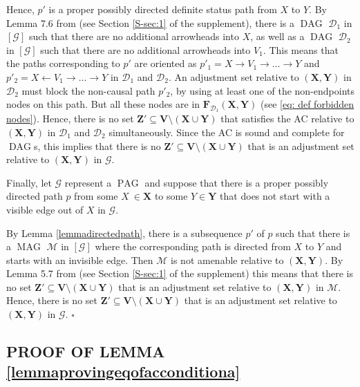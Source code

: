 \documentclass[]{article}
\DeclareMathOperator{\DAG}{DAG}
\DeclareMathOperator{\MAG}{MAG}
\DeclareMathOperator{\PAG}{PAG}
\newenvironment{proofsketchamenab}{\noindent{\bf Proof of Lemma \ref{lemmaadjamengen}:}}%
{\hfill $\square$}
\theoremstyle{definition}
\theoremstyle{remark}
\newcommand{\vars}[1][V]{\mathbf{#1}}
\newcommand{\g}[1][G]{\mathcal{#1}}
\newcommand{\fb}[2][X,Y]{\mathbf{F}_{#2}(\mathbf{#1})}%
\begin{document}
\begin{proofsketchamenab}
   Hence, $p'$ is a proper possibly directed definite status path from $X$ to $Y$. By Lemma 7.6 from \citet{maathuis2013generalized} (see Section \ref{S-sec:1} of the supplement), there is a $\DAG$ $\g[D]_1$ in $[\g]$ such that there are no additional arrowheads into $X$, as well as a $\DAG$ $\g[D]_2$ in $[\g]$ such that there are no additional arrowheads into $V_1$. This means that the paths corresponding to $p'$ are oriented as $p'_1 = X \to V_1 \to \dots \to Y$ and $p'_2 = X \leftarrow V_1 \to \dots \to Y$ in $\g[D]_1$ and $\g[D]_2$.
   An adjustment set relative to $(\mathbf{X},\mathbf{Y})$ in $\g[D]_2$ must block the non-causal path $p'_{2}$, by using at least one of the non-endpoints nodes on this path. But all these nodes are in $\fb{\g[D]_1}$ (see \eqref{eq: def forbidden nodes}). Hence, there is no set $\mathbf{Z}' \subseteq \vars \setminus (\mathbf{X} \cup \mathbf{Y})$ that satisfies the AC relative to $(\mathbf{X},\mathbf{Y})$ in $\g[D]_1$ and $\g[D]_2$ simultaneously. Since the AC is sound and complete for $\DAG$s, this implies that there is no $\mathbf{Z}' \subseteq \vars \setminus (\mathbf{X} \cup \mathbf{Y})$ that is an adjustment set relative to $(\mathbf{X},\mathbf{Y})$ in $\g$.

   Finally, let $\g$ represent a $\PAG$ and suppose that there is a proper possibly directed path $p$ from some $X\ \in \mathbf{X}$ to some $Y\in \mathbf{Y}$ that does not start with a visible edge out of $X$ in $\g$.

  By Lemma \ref{lemmadirectedpath}, there is a subsequence $p'$ of $p$ such that there is a $\MAG$ $\g[M]$ in $[\g]$ where the corresponding path is directed from $X$ to $Y$ and starts with an invisible edge.
   Then $\g[M]$ is not amenable relative to $(\mathbf{X},\mathbf{Y})$. By Lemma 5.7 from \citet{vanconstructing} (see Section \ref{S-sec:1} of the supplement) this means that there is no set $\mathbf{Z}' \subseteq \vars \setminus (\mathbf{X} \cup \mathbf{Y})$ that is an adjustment set relative to $(\mathbf{X},\mathbf{Y})$ in $\g[M]$. Hence, there is no set $\mathbf{Z}' \subseteq \vars \setminus (\mathbf{X} \cup \mathbf{Y})$ that is an adjustment set relative to $(\mathbf{X},\mathbf{Y})$ in $\g$.
\end{proofsketchamenab}

\subsection{PROOF OF LEMMA \ref{lemmaprovingeqofacconditiona}}\label{sec: eq of condition a}
\end{document}
